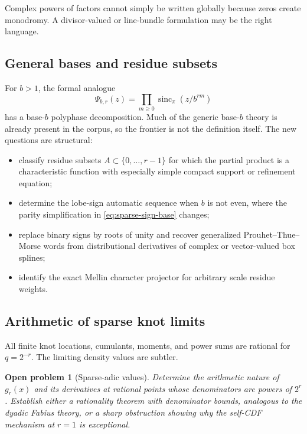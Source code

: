 \documentclass[11pt,oneside]{article}
\numberwithin{equation}{section}
\newtheorem{problem}[theorem]{Open problem}
\theoremstyle{definition}
\theoremstyle{remark}
\newcommand{\sincpi}{\operatorname{sinc}_{\pi}}
\begin{document}
Complex powers of factors cannot simply be written globally because zeros
create monodromy.  A divisor-valued or line-bundle formulation may be the right
language.

\subsection{General bases and residue subsets}

For $b>1$, the formal analogue
\begin{equation}
 \Psi_{b,r}(z)=\prod_{m\ge0}\sincpi(z/b^{rm})              \label{eq:base-b-sparse}
\end{equation}
has a base-$b$ polyphase decomposition.  Much of the generic base-$b$ theory is
already present in the corpus, so the frontier is not the definition itself.
The new questions are structural:
\begin{itemize}
\item classify residue subsets $A\subset\{0,\ldots,r-1\}$ for which the
      partial product is a characteristic function with especially simple
      compact support or refinement equation;
\item determine the lobe-sign automatic sequence when $b$ is not even, where
      the parity simplification in \eqref{eq:sparse-sign-base} changes;
\item replace binary signs by roots of unity and recover generalized
      Prouhet--Thue--Morse words from distributional derivatives of complex or
      vector-valued box splines;
\item identify the exact Mellin character projector for arbitrary scale
      residue weights.
\end{itemize}

\subsection{Arithmetic of sparse knot limits}

All finite knot locations, cumulants, moments, and power sums are rational for
$q=2^{-r}$.  The limiting density values are subtler.

\begin{problem}[Sparse-adic values]
Determine the arithmetic nature of $g_r(x)$ and its derivatives at rational
points whose denominators are powers of $2^r$.  Establish either a rationality
theorem with denominator bounds, analogous to the dyadic Fabius theory, or a
sharp obstruction showing why the self-CDF mechanism at $r=1$ is exceptional.
\end{problem}
\end{document}
